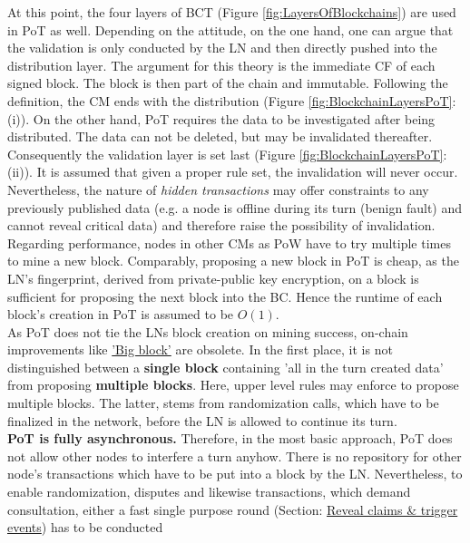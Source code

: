 \noindent At this point, the four layers of \gls{BCT} (Figure \ref{fig:LayersOfBlockchains}) are used in \gls{PoT} as well.
Depending on the attitude, on the one hand, one can argue that the validation is only conducted by the \gls{LN} and then directly pushed into the distribution layer.
The argument for this theory is the immediate \gls{CF} of each signed block.
The block is then part of the chain and immutable.
Following the definition, the \gls{CM} ends with the distribution (Figure \ref{fig:BlockchainLayersPoT}: (i)).
On the other hand, \gls{PoT} requires the data to be investigated after being distributed.
The data can not be deleted, but may be invalidated thereafter.
Consequently the validation layer is set last (Figure \ref{fig:BlockchainLayersPoT}: (ii)).
It is assumed that given a proper rule set, the invalidation will never occur.
Nevertheless, the nature of \textit{hidden transactions} may offer constraints to any previously published data (e.g. a node is offline during its turn (benign fault) and cannot reveal critical data) and
therefore raise the possibility of invalidation. \\
Regarding performance, nodes in other \gls{CM}s as \gls{PoW} have to try multiple times to mine a new block.
Comparably, proposing a new block in \gls{PoT} is cheap,
as the \gls{LN}'s fingerprint, derived from private-public key encryption,
on a block is sufficient for proposing the next block into the \gls{BC}.
Hence the runtime of each block's creation in \gls{PoT} is assumed to be $O(1)$. \\
As \gls{PoT} does not tie the \gls{LN}s block creation on mining success,
on-chain improvements like \hyperref[sec:PerformanceImprovements]{'Big block'} are obsolete.
In the first place, it is not distinguished between a \textbf{single block} containing
'all in the turn created data' from proposing \textbf{multiple blocks}.
Here, upper level rules may enforce to propose multiple blocks.
The latter, stems from randomization calls, which have to be finalized in the network,
before the \gls{LN} is allowed to continue its turn. \\
\textbf{\gls{PoT} is fully asynchronous.}
Therefore, in the most basic approach, \gls{PoT} does not allow other nodes to interfere a turn anyhow.
There is no repository for other node's transactions which have to be put into a block by the \gls{LN}.
Nevertheless, to enable randomization, disputes and likewise transactions, which demand consultation, either a fast single purpose round
(Section: \hyperref[sec:ClaimsAndTriggers]{Reveal claims \& trigger events}) has to be conducted
